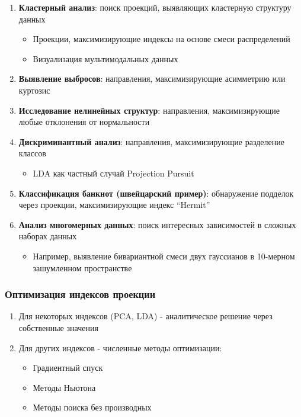 \documentclass[a4paper,12pt]{article}
\begin{document}
\begin{enumerate}
    \item \textbf{Кластерный анализ}: поиск проекций, выявляющих кластерную структуру данных
    \begin{itemize}
        \item Проекции, максимизирующие индексы на основе смеси распределений
        \item Визуализация мультимодальных данных
    \end{itemize}

    \item \textbf{Выявление выбросов}: направления, максимизирующие асимметрию или куртозис

    \item \textbf{Исследование нелинейных структур}: направления, максимизирующие любые отклонения от нормальности

    \item \textbf{Дискриминантный анализ}: направления, максимизирующие разделение классов
    \begin{itemize}
        \item LDA как частный случай Projection Pursuit
    \end{itemize}

    \item \textbf{Классификация банкнот (швейцарский пример)}: обнаружение подделок через проекции, максимизирующие индекс ``Hermit''

    \item \textbf{Анализ многомерных данных}: поиск интересных зависимостей в сложных наборах данных
    \begin{itemize}
        \item Например, выявление бивариантной смеси двух гауссианов в 10-мерном зашумленном пространстве
    \end{itemize}
\end{enumerate}

\subsubsection{Оптимизация индексов проекции}
\begin{enumerate}
    \item Для некоторых индексов (PCA, LDA) - аналитическое решение через собственные значения
    \item Для других индексов - численные методы оптимизации:
    \begin{itemize}
        \item Градиентный спуск
        \item Методы Ньютона
        \item Методы поиска без производных
    \end{itemize}
\end{enumerate}
\end{document}

